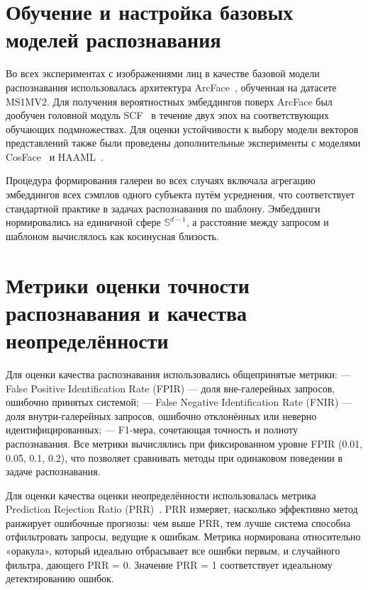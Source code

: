 \section{Обучение и настройка базовых моделей распознавания}\label{sec:experiment_setup/backbones}
Во всех экспериментах с изображениями лиц в качестве базовой модели распознавания использовалась архитектура ArcFace~\cite{deng2019arcface}, обученная на датасете MS1MV2.  
Для получения вероятностных эмбеддингов поверх ArcFace был дообучен головной модуль SCF~\cite{scf} в течение двух эпох на соответствующих обучающих подмножествах.
Для оценки устойчивости к выбору модели векторов представлений также были проведены дополнительные эксперименты с моделями CosFace~\cite{wang2018cosface} и HAAML~\cite{cao2025open}.

Процедура формирования галереи во всех случаях включала агрегацию эмбеддингов всех сэмплов одного субъекта путём усреднения, что соответствует стандартной практике в задачах распознавания по шаблону.  
Эмбеддинги нормировались на единичной сфере $\mathbb{S}^{d-1}$, а расстояние между запросом и шаблоном вычислялось как косинусная близость.
\section{Метрики оценки точности распознавания и качества неопределённости}\label{sec:experiment_setup/metrics}
Для оценки качества распознавания использовались общепринятые метрики:  
— False Positive Identification Rate (FPIR) — доля вне-галерейных запросов, ошибочно принятых системой;
— False Negative Identification Rate (FNIR) — доля внутри-галерейных запросов, ошибочно отклонённых или неверно идентифицированных;
— F1-мера, сочетающая точность и полноту распознавания.
Все метрики вычислялись при фиксированном уровне FPIR (0.01, 0.05, 0.1, 0.2), что позволяет сравнивать методы при одинаковом поведении в задаче распознавания.

Для оценки качества оценки неопределённости использовалась метрика Prediction Rejection Ratio (PRR)~\cite{malinin2017incorporating}.  
PRR измеряет, насколько эффективно метод ранжирует ошибочные прогнозы: чем выше PRR, тем лучше система способна отфильтровать запросы, ведущие к ошибкам.
Метрика нормирована относительно «оракула», который идеально отбрасывает все ошибки первым, и случайного фильтра, дающего PRR = 0. Значение PRR = 1 соответствует идеальному детектированию ошибок.
